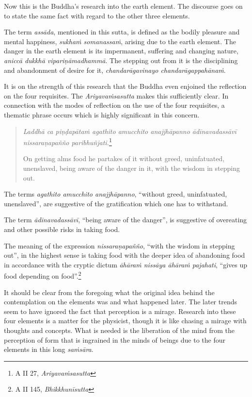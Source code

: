 Now this is the Buddha's research into the earth element. The discourse goes on to state the same fact with regard to the other three elements.

The term \emph{assāda}, mentioned in this sutta, is defined as the bodily pleasure and mental happiness, \emph{sukhaṁ somanassaṁ}, arising due to the earth element. The danger in the earth element is its impermanent, suffering and changing nature, \emph{aniccā dukkhā vipariṇāmadhammā}. The stepping out from it is the disciplining and abandonment of desire for it, \emph{chandarāgavinayo chandarāgappahānaṁ}.

It is on the strength of this research that the Buddha even enjoined the reflection on the four requisites. The \emph{Ariyavaṁsasutta} makes this sufficiently clear. In connection with the modes of reflection on the use of the four requisites, a thematic phrase occurs which is highly significant in this concern.

\begin{quote}
\emph{Laddhā ca piṇḍapātaṁ agathito amucchito anajjhāpanno ādīnavadassāvī nissaraṇapañño paribhuñjati.}\footnote{A II 27, \emph{Ariyavaṁsasutta}}

On getting alms food he partakes of it without greed, uninfatuated, unenslaved, being aware of the danger in it, with the wisdom in stepping out.
\end{quote}

The terms \emph{agathito amucchito anajjhāpanno}, ``without greed, uninfatuated, unenslaved'', are suggestive of the gratification which one has to withstand.

The term \emph{ādīnavadassāvī}, ``being aware of the danger'', is suggestive of overeating and other possible risks in taking food.

\clearpage

The meaning of the expression \emph{nissaraṇapañño}, ``with the wisdom in stepping out'', in the highest sense is taking food with the deeper idea of abandoning food in accordance with the cryptic dictum \emph{āhāraṁ nissāya āhāraṁ pajahati}, ``gives up food depending on food''.\footnote{A II 145, \emph{Bhikkhunīsutta}}

It should be clear from the foregoing what the original idea behind the contemplation on the elements was and what happened later. The later trends seem to have ignored the fact that perception is a mirage. Research into these four elements is a matter for the physicist, though it is like chasing a mirage with thoughts and concepts. What is needed is the liberation of the mind from the perception of form that is ingrained in the minds of beings due to the four elements in this long \emph{saṁsāra}.

